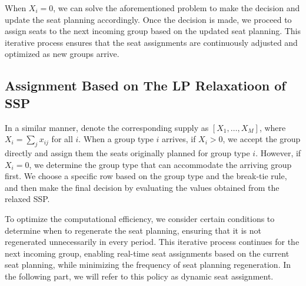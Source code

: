 When $X_i = 0$, we can solve the aforementioned problem to make the decision and update the seat planning accordingly. Once the decision is made, we proceed to assign seats to the next incoming group based on the updated seat planning. This iterative process ensures that the seat assignments are continuously adjusted and optimized as new groups arrive.

\subsection{Assignment Based on The LP Relaxatioon of SSP}
In a similar manner, denote the corresponding supply as $[X_1, \ldots, X_M]$, where $X_i = \sum_{j} x_{ij}$ for all $i$. When a group type $i$ arrives, if $X_i > 0$, we accept the group directly and assign them the seats originally planned for group type $i$. However, if $X_i = 0$, we determine the group type that can accommodate the arriving group first. We choose a specific row based on the group type and the break-tie rule, and then make the final decision by evaluating the values obtained from the relaxed SSP.

To optimize the computational efficiency, we consider certain conditions to determine when to regenerate the seat planning, ensuring that it is not regenerated unnecessarily in every period. This iterative process continues for the next incoming group, enabling real-time seat assignments based on the current seat planning, while minimizing the frequency of seat planning regeneration. In the following part, we will refer to this policy as dynamic seat assignment.




